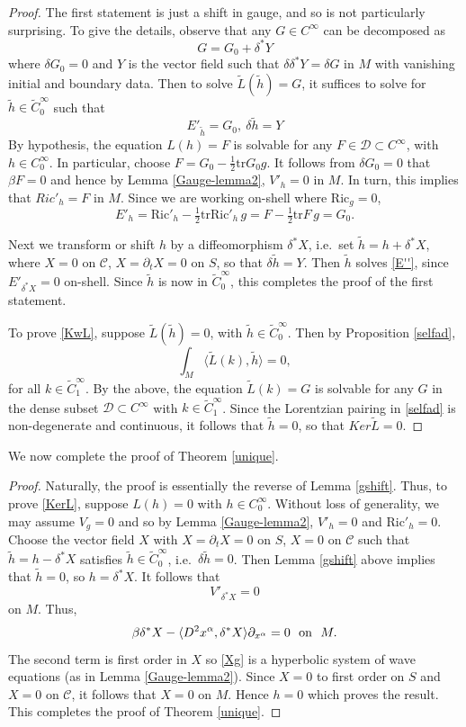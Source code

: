 \documentclass[10pt]{amsart}
\renewcommand{\a}{\alpha}
\renewcommand{\b}{\beta}
\renewcommand{\d}{\delta}
\newcommand{\cC}{{\mathcal C}}
\newcommand{\cD}{{\mathcal D}}
\newcommand{\Ric}{\mathrm{Ric}}
\newcommand{\be}{\begin{equation}}
\newcommand{\ee}{\end{equation}}
\newcommand{\bes}{\begin{equation*}}
\newcommand{\ees}{\end{equation*}}
\newcommand{\tr}{\mathrm{tr}}
\newcommand{\p}{\partial}
\newcommand{\<}{\langle}
\renewcommand{\>}{\rangle}
\newcommand{\w}{\widetilde}
\theoremstyle{plain}
\theoremstyle{remark}
\theoremstyle{definition}
\numberwithin{equation}{section}
\begin{document}
\begin{proof} 
  The first statement is just a shift in gauge, and so is not particularly surprising. To give the details, observe that 
any $G\in C^\infty$ can be decomposed as 
\bes
G=G_0+\d^* Y
\ees
where $\d G_0=0$ and $Y$ is the vector field such that $\d\d^* Y=\d G$ in $M$ with vanishing initial and boundary data. Then to solve 
$\w L(\w h)=G$, it suffices to solve for $\w h\in\w C^\infty_0$ such that 
\be\label{E''}
E'_{\w h}=G_0, \ \d \w h=Y
\ee
By hypothesis, the equation $L(h) = F$ is solvable for any $F \in \cD \subset C^{\infty}$, with $h \in C^{\infty}_0$. In particular, choose $F=G_0-\frac{1}{2}\tr G_0 g$. 
It follows from $\d G_0=0$ that $\b F=0$ and hence by Lemma \ref{Gauge-lemma2}, $V'_h = 0$ in $M$. In turn, this implies that $Ric'_h = F$ in 
$M$. Since we are working on-shell where $\Ric_g = 0$, 
$$E'_h = \Ric'_h - \tfrac{1}{2}\tr \Ric'_h \, g = F - \tfrac{1}{2}\tr F \, g=G_0.$$ 

Next we transform or shift $h$ by a diffeomorphism $\d^*X$, i.e.~set $\w h = h + \d^*X$, where $X = 0$ on $\cC$, $X = \p_t X = 0$ on 
$S$, so that $\d \w h = Y$. Then $\w h$ solves \eqref{E''}, since $E'_{\d^*X} = 0$ on-shell. Since $\w h$ is now in $\w C^{\infty}_0$, this 
completes the proof of the first statement. 

  To prove \eqref{KwL}, suppose $\w L(\w h) = 0$, with $\w h \in \w C^{\infty}_0$. Then by Proposition \ref{selfad}, 
$$\int_M \<\w L(k), \w h\> = 0,$$
for all $k \in \w C^{\infty}_1$. By the above, the equation $\w L(k) = G$ is solvable for any $G$ in the dense subset $\cD \subset C^{\infty}$ with 
$k \in \w C^{\infty}_1$. Since the Lorentzian pairing in \eqref{selfad} is non-degenerate and continuous, it follows that $\w h = 0$, so that $Ker \w L = 0$. 

\end{proof}

  We now complete the proof of Theorem \ref{unique}. 
  
\begin{proof}

  Naturally, the proof is essentially the reverse of Lemma \ref{gshift}. Thus, to prove \eqref{KerL}, suppose $L(h) = 0$ with $h \in C^{\infty}_0$. Without 
loss of generality, we may assume $V_g = 0$ and so by Lemma \ref{Gauge-lemma2}, $V'_h = 0$ and $\Ric'_h = 0$. Choose the vector field $X$ with 
$X = \p_t X = 0$ on $S$, $X = 0$ on $\cC$ such that $\w h = h - \d^*X$ satisfies $\w h \in \w C^{\infty}_0$, i.e.~$\d \w h = 0$. Then Lemma \ref{gshift} 
above implies that $\w h = 0$, so $h = \d^*X$. It follows that 
$$V'_{\d^*X} = 0$$
on $M$. Thus, 
\be \label{Xg}
\b \d^*X - \<D^2 x^{\a}, \d^*X\>\p_{x^{\a}} = 0 \ \ {\rm on} \ \ M.
\ee
The second term is first order in $X$ so \eqref{Xg} is a hyperbolic system of wave equations (as in Lemma \ref{Gauge-lemma2}). Since $X = 0$ to 
first order on $S$ and $X = 0$ on $\cC$, it follows that $X = 0$ on $M$. Hence $h = 0$ which proves the result. This completes the proof of 
Theorem \ref{unique}.  

\end{proof}
\end{document}
